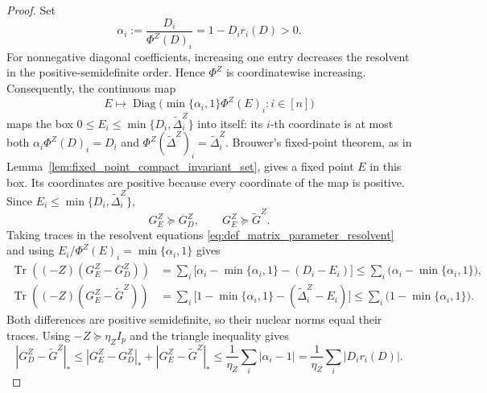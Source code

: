 \documentclass[EJP, preprint, NODS, nobera, nofontexpansion]{ejpecp}
\DeclareMathOperator{\tr}{Tr}
\DeclareMathOperator{\diag}{Diag}
\begin{document}
\begin{proof}
Set
\[
    \alpha_i
    :=\frac{D_i}{\Phi^Z(D)_i}
    =1-D_i r_i(D)>0.
\]
For nonnegative diagonal coefficients, increasing one entry decreases
the resolvent in the positive-semidefinite order.
Hence \(\Phi^Z\) is coordinatewise increasing. Consequently, the continuous map
\[
    E\longmapsto
    \diag\bigl(\min\{\alpha_i,1\}\Phi^Z(E)_i:i\in[n]\bigr)
\]
maps the box \(0\leq E_i\leq\min\{D_i,\widetilde\Delta_i^Z\}\) into
itself: its \(i\)-th coordinate is at most both
\(\alpha_i\Phi^Z(D)_i=D_i\) and
\(\Phi^Z(\widetilde\Delta^Z)_i=\widetilde\Delta_i^Z\).
Brouwer's fixed-point theorem, as in
Lemma~\ref{lem:fixed_point_compact_invariant_set},
gives a fixed point \(E\) in this box.
Its coordinates are positive because every coordinate of the map
is positive. Since \(E_i\leq\min\{D_i,\widetilde\Delta_i^Z\}\),
\[
    G_E^Z\succeq G_D^Z,
    \qquad
    G_E^Z\succeq\widetilde G^Z.
\]
Taking traces in the resolvent equations
\eqref{eq:def_matrix_parameter_resolvent} and using
\(E_i/\Phi^Z(E)_i=\min\{\alpha_i,1\}\) gives
\begin{align*}
    \tr\!\left((-Z)(G_E^Z-G_D^Z)\right)
    &=
    \sum_i\bigl[\alpha_i-\min\{\alpha_i,1\}-(D_i-E_i)\bigr]
    \leq\sum_i\bigl(\alpha_i-\min\{\alpha_i,1\}\bigr),\\
    \tr\!\left((-Z)(G_E^Z-\widetilde G^Z)\right)
    &=
    \sum_i\bigl[1-\min\{\alpha_i,1\}
        -(\widetilde\Delta_i^Z-E_i)\bigr]
    \leq\sum_i\bigl(1-\min\{\alpha_i,1\}\bigr).
\end{align*}
Both differences are positive semidefinite, so their nuclear norms
equal their traces. Using \(-Z\succeq\eta_ZI_p\) and
the triangle inequality gives
\[
    |G_D^Z-\widetilde G^Z|_*
    \leq
    |G_E^Z-G_D^Z|_*+|G_E^Z-\widetilde G^Z|_*
    \leq
    \frac1{\eta_Z}\sum_i|\alpha_i-1|
    =
    \frac1{\eta_Z}\sum_i|D_i r_i(D)|.
\]
\end{proof}
\end{document}
